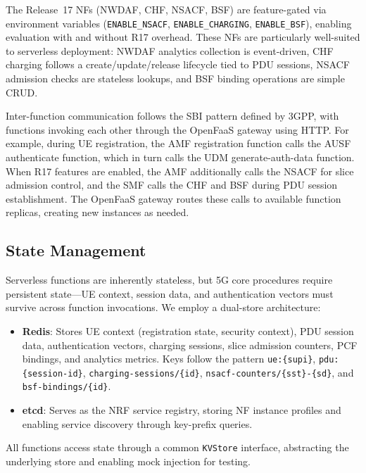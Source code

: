 The Release~17 NFs (NWDAF, CHF, NSACF, BSF) are feature-gated via environment variables (\texttt{ENABLE\_NSACF}, \texttt{ENABLE\_CHARGING}, \texttt{ENABLE\_BSF}), enabling evaluation with and without R17 overhead. These NFs are particularly well-suited to serverless deployment: NWDAF analytics collection is event-driven, CHF charging follows a create/update/release lifecycle tied to PDU sessions, NSACF admission checks are stateless lookups, and BSF binding operations are simple CRUD.

Inter-function communication follows the SBI pattern defined by 3GPP, with functions invoking each other through the OpenFaaS gateway using HTTP. For example, during UE registration, the AMF registration function calls the AUSF authenticate function, which in turn calls the UDM generate-auth-data function. When R17 features are enabled, the AMF additionally calls the NSACF for slice admission control, and the SMF calls the CHF and BSF during PDU session establishment. The OpenFaaS gateway routes these calls to available function replicas, creating new instances as needed.

\subsection{State Management}

Serverless functions are inherently stateless, but 5G core procedures require persistent state---UE context, session data, and authentication vectors must survive across function invocations. We employ a dual-store architecture:

\begin{itemize}
    \item \textbf{Redis}: Stores UE context (registration state, security context), PDU session data, authentication vectors, charging sessions, slice admission counters, PCF bindings, and analytics metrics. Keys follow the pattern \texttt{ue:\{supi\}}, \texttt{pdu:\{session-id\}}, \texttt{charging-sessions/\{id\}}, \texttt{nsacf-counters/\{sst\}-\{sd\}}, and \texttt{bsf-bindings/\{id\}}.
    \item \textbf{etcd}: Serves as the NRF service registry, storing NF instance profiles and enabling service discovery through key-prefix queries.
\end{itemize}

All functions access state through a common \texttt{KVStore} interface, abstracting the underlying store and enabling mock injection for testing.


